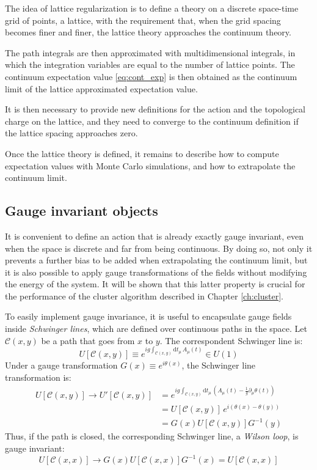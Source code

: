 The idea of lattice regularization is to define a theory on a discrete space-time grid of points, \ie a lattice,
with the requirement that, when the grid spacing becomes finer and finer,
the lattice theory approaches the continuum theory.

The path integrals are then approximated with multidimensional integrals, in which the integration variables are equal to the number of lattice points.
The continuum expectation value \eqref{eq:cont_exp} is then obtained as the continuum limit of the lattice approximated expectation value.

It is then necessary to provide new definitions for the action and the topological charge on the lattice,
and they need to converge to the continuum definition if the lattice spacing approaches zero.

Once the lattice theory is defined, it remains to describe how to compute expectation values with Monte Carlo simulations, and how to extrapolate the continuum limit.

\subsection*{Gauge invariant objects}

It is convenient to define an action that is already exactly gauge invariant, even when the space is discrete and far from being continuous.
By doing so, not only it prevents a further bias to be added when extrapolating the continuum limit,
but it is also possible to apply gauge transformations of the fields without modifying the energy of the system.
It will be shown that this latter property is crucial for the performance of the cluster algorithm described in Chapter \ref{ch:cluster}.

To easily implement gauge invariance, it is useful to encapsulate gauge fields inside \emph{Schwinger lines}, which are defined over continuous paths in the space.
Let $\mathcal C(x,y)$ be a path that goes from $x$ to $y$. The correspondent Schwinger line is:
\[
    U[\mathcal C(x,y)] \equiv e^{ig\int_{\mathcal C(x,y)}\mathrm dt_\mu\,A_\mu(t)} \in U(1)
\]
Under a gauge transformation $G(x) \equiv e^{i\theta(x)}$, the Schwinger line transformation is:
\begin{equation}\label{eq:path_gauge}
    \begin{aligned}
    U[\mathcal C(x,y)] \rightarrow U'[\mathcal C(x,y)] &= e^{ig\int_{\mathcal C(x,y)}\mathrm dt_\mu\,\left(A_\mu(t) - \frac{1}{g}\partial_\mu\theta(t)\right)} \\
                                                       &= U[\mathcal C(x,y)]\,e^{i(\theta(x) - \theta(y))} \\
                                                       &= G(x)U[\mathcal C(x,y)]G^{-1}(y)
    \end{aligned}
\end{equation}
Thus, if the path is closed, the corresponding Schwinger line, \ie a \emph{Wilson loop}, is gauge invariant:
\[
    U[\mathcal C(x,x)] \rightarrow G(x)U[\mathcal C(x,x)]G^{-1}(x) = U[\mathcal C(x,x)]
\]

